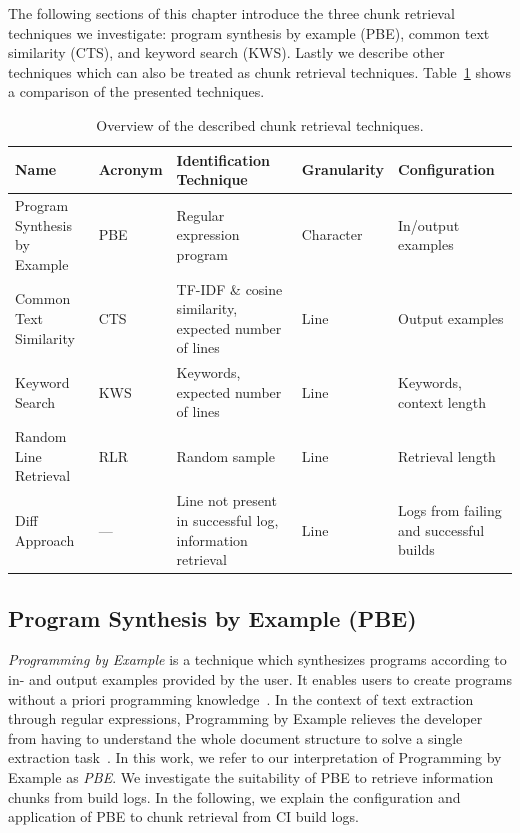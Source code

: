 \documentclass[\myrootdir/main.tex]{subfiles}
\begin{document}
The following sections of this chapter introduce the three chunk retrieval techniques we investigate: program synthesis by example (PBE), common text similarity (CTS), and keyword search (KWS).
Lastly we describe other techniques which can also be treated as chunk retrieval techniques.
Table~\ref{tab:ctr} shows a comparison of the presented techniques.

\begin{table}[H]
\centering
\caption{Overview of the described chunk retrieval techniques.}
\begin{tabularx}{\textwidth}{@{}XlXlX@{}} 
\toprule
Name                         & Acronym & Identification Technique                                   & Granularity & Configuration             \\ 
\midrule
Program Synthesis by Example & PBE     & Regular expression program                                 & Character   & In/output examples      \\
Common Text Similarity       & CTS     & TF-IDF \& cosine similarity, expected number of lines & Line        & Output examples           \\
Keyword Search               & KWS     & Keywords, expected number of lines                    & Line        & Keywords, context length  \\
Random Line Retrieval        & RLR     & Random sample                                              & Line        & Retrieval length          \\
Diff Approach                & ---        & Line not present in successful log, information retrieval  & Line        & Logs from failing and successful builds      \\
\bottomrule
\end{tabularx}
\label{tab:ctr}
\end{table}

\subsection{Program Synthesis by Example (PBE)}
\label{sec:expl-pbe}
\emph{Programming by Example} is a technique which synthesizes programs according to in- and output examples provided by the user.
It enables users to create programs without a priori programming knowledge~\cite{mayer2015user}.
In the context of text extraction through regular expressions, Programming by Example relieves the developer from having to understand the whole document structure to solve a single extraction task~\cite{le2014flashextract:}.
In this work, we refer to our interpretation of Programming by Example as \emph{PBE}\@.
We investigate the suitability of PBE to retrieve information chunks from build logs.
In the following, we explain the configuration and application of PBE to chunk retrieval from CI build logs.
\end{document}
